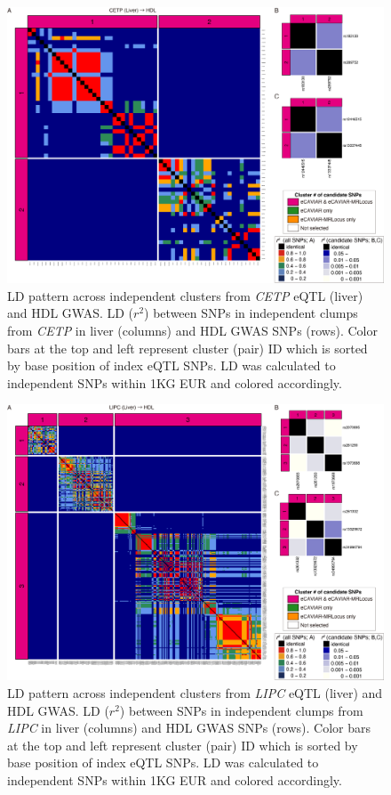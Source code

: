 \documentclass[11pt]{article}
\begin{document}
\begin{figure}[!ht]
  \centering
  \includegraphics[width=.7\textwidth]{figs/region/heatmap_eQTLbase.Liver_CETP_HDL.20201217.png}
  \caption{LD pattern across independent clusters from \emph{CETP}
    eQTL (liver) and HDL GWAS. LD ($r^2$) between SNPs in independent
    clumps from \emph{CETP} in liver (columns) and HDL GWAS SNPs
    (rows). Color bars at the top and left represent cluster (pair) ID
    which is sorted by base position of index eQTL SNPs. LD was
    calculated to independent SNPs within 1KG EUR and colored
    accordingly.} 
\end{figure}

\begin{figure}[!ht]
  \centering
  \includegraphics[width=.7\textwidth]{figs/region/heatmap_eQTLbase.Liver_LIPC_HDL.20201217.png}
  \caption{LD pattern across independent clusters from \emph{LIPC}
    eQTL (liver) and HDL GWAS. LD ($r^2$) between SNPs in independent
    clumps from \emph{LIPC} in liver (columns) and HDL GWAS SNPs
    (rows). Color bars at the top and left represent cluster (pair) ID
    which is sorted by base position of index eQTL SNPs. LD was
    calculated to independent SNPs within 1KG EUR and colored
    accordingly.} 
\end{figure}
\end{document}
